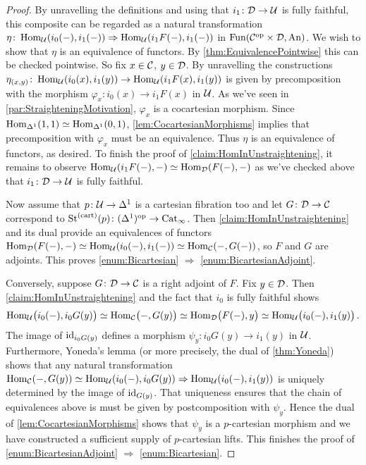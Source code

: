 \begin{proof}
	By unravelling the definitions and using that $i_1\colon \mathcal{D}\rightarrow \mathcal{U}$ is fully faithful, this composite can be regarded as a natural transformation $\eta\colon \operatorname{Hom}_{\mathcal{U}}(i_0(-),i_1(-))\Rightarrow \operatorname{Hom}_{\mathcal{U}}(i_1F(-),i_1(-))$ in $\operatorname{Fun}(\mathcal{C}^{\mathrm{op}}\times\mathcal{D},\mathrm{An})$. We wish to show that $\eta$ is an equivalence of functors. By \cref{thm:EquivalencePointwise} this can be checked pointwise. So fix $x\in \mathcal{C}$, $y\in\mathcal{D}$. By unravelling the constructions $\eta_{(x,y)}\colon \operatorname{Hom}_{\mathcal{U}}(i_0(x),i_1(y))\rightarrow \operatorname{Hom}_{\mathcal{U}}(i_1F(x),i_1(y))$ is given by precomposition with the morphism $\varphi_x\colon i_0(x)\rightarrow i_1F(x)$ in $\mathcal{U}$. As we've seen in \cref{par:StraighteningMotivation}, $\varphi_x$ is a cocartesian morphism. Since $\operatorname{Hom}_{\Delta^1}(1,1)\simeq \operatorname{Hom}_{\Delta^1}(0,1)$, \cref{lem:CocartesianMorphisms} implies that precomposition with $\varphi_x$ must be an equivalence. Thus $\eta$ is an equivalence of functors, as desired. To finish the proof of \cref{claim:HomInUnstraightening}, it remains to observe $\operatorname{Hom}_{\mathcal{U}}(i_1F(-),-)\simeq \operatorname{Hom}_{\mathcal{D}}(F(-),-)$ as we've checked above that $i_1\colon \mathcal{D}\rightarrow \mathcal{U}$ is fully faithful.
	
	Now assume that $p\colon \mathcal{U}\rightarrow \Delta^1$ is a cartesian fibration too and let $G\colon \mathcal{D}\rightarrow \mathcal{C}$ correspond to $\operatorname{St}^{(\mathrm{cart})}(p)\colon (\Delta^1)^{\mathrm{op}}\rightarrow \mathrm{Cat}_\infty$. Then \cref{claim:HomInUnstraightening} and its dual provide an equivalences of functors $\operatorname{Hom}_{\mathcal{D}}(F(-),-)\simeq \operatorname{Hom}_{\mathcal{U}}(i_0(-),i_1(-))\simeq \operatorname{Hom}_{\mathcal{C}}(-,G(-))$, so $F$ and $G$ are adjoints. This proves \cref{enum:Bicartesian} $\Rightarrow$ \cref{enum:BicartesianAdjoint}.
	
	Conversely, suppose $G\colon \mathcal{D}\rightarrow \mathcal{C}$ is a right adjoint of $F$. Fix $y\in \mathcal{D}$. Then \cref{claim:HomInUnstraightening} and the fact that $i_0$ is fully faithful shows
	\begin{equation*}
		\operatorname{Hom}_{\mathcal{U}}\bigl(i_0(-),i_0G(y)\bigr)\simeq \operatorname{Hom}_{\mathcal{C}}\bigl(-,G(y)\bigr)\simeq \operatorname{Hom}_{\mathcal{D}}\bigl(F(-),y\bigr)\simeq \operatorname{Hom}_{\mathcal{U}}\bigl(i_0(-),i_1(y)\bigr)\,.
	\end{equation*}
	The image of $\operatorname{id}_{i_0G(y)}$ defines a morphism $\psi_y\colon i_0G(y)\rightarrow i_1(y)$ in $\mathcal{U}$. Furthermore, Yoneda's lemma (or more precisely, the dual of \cref{thm:Yoneda}) shows that any natural transformation $\operatorname{Hom}_{\mathcal{C}}(-,G(y))\simeq \operatorname{Hom}_{\mathcal{U}}(i_0(-),i_0G(y))\Rightarrow \operatorname{Hom}_{\mathcal{U}}(i_0(-),i_1(y))$ is uniquely determined by the image of $\operatorname{id}_{G(y)}$. That uniqueness ensures that the chain of equivalences above is must be given by postcomposition with $\psi_y$. Hence the dual of \cref{lem:CocartesianMorphisms} shows that $\psi_y$ is a $p$-cartesian morphism and we have constructed a sufficient supply of $p$-cartesian lifts. This finishes the proof of \cref{enum:BicartesianAdjoint} $\Rightarrow$ \cref{enum:Bicartesian}.
\end{proof}
